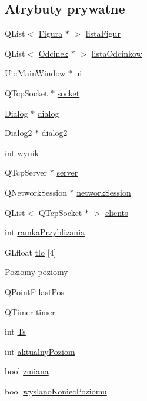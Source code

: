 \subsection*{Atrybuty prywatne}
\begin{DoxyCompactItemize}
\item 
Q\-List$<$ \hyperlink{classFigura}{Figura} $\ast$ $>$ \hyperlink{classMainWindow_a8a91987c12db69417cdb275cf712b9df}{lista\-Figur}
\item 
Q\-List$<$ \hyperlink{classOdcinek}{Odcinek} $\ast$ $>$ \hyperlink{classMainWindow_abaa648f21383f580a833d7ed90f75926}{lista\-Odcinkow}
\item 
\hyperlink{classUi_1_1MainWindow}{Ui\-::\-Main\-Window} $\ast$ \hyperlink{classMainWindow_a43606649aeaf9e561328935fca0cd1bf}{ui}
\item 
Q\-Tcp\-Socket $\ast$ \hyperlink{classMainWindow_af85cfe62c116f8d2f2021e5411b0356e}{socket}
\item 
\hyperlink{classDialog}{Dialog} $\ast$ \hyperlink{classMainWindow_a029f5f35facf7120bbf42e54dbd25a40}{dialog}
\item 
\hyperlink{classDialog2}{Dialog2} $\ast$ \hyperlink{classMainWindow_acca874ff840ec87fe90e0acc72d40e5a}{dialog2}
\item 
int \hyperlink{classMainWindow_a2b0740aaca0b5b566008e55916d4d0e9}{wynik}
\item 
Q\-Tcp\-Server $\ast$ \hyperlink{classMainWindow_a4b1e890b4b33f6ff8c22621d2ce55c2d}{server}
\item 
Q\-Network\-Session $\ast$ \hyperlink{classMainWindow_a638a10aec0de799787205387ee4da83e}{network\-Session}
\item 
Q\-List$<$ Q\-Tcp\-Socket $\ast$ $>$ \hyperlink{classMainWindow_a698f52eb8759a1cde60c5638670b078e}{clients}
\item 
int \hyperlink{classMainWindow_a0909fe6df1d60edacad5591acb011a2f}{ramka\-Przyblizania}
\item 
G\-Lfloat \hyperlink{classMainWindow_a8e9fb49dd7c36fac9e2d83b555e0caa6}{tlo} \mbox{[}4\mbox{]}
\item 
\hyperlink{classPoziomy}{Poziomy} \hyperlink{classMainWindow_a6bc6d2f12427573392ddfbc8d7f454fd}{poziomy}
\item 
Q\-Point\-F \hyperlink{classMainWindow_a479094513b0598030f63a24963e2109e}{last\-Pos}
\item 
Q\-Timer \hyperlink{classMainWindow_a3c80cf51d9dfb16e655a7e25f8016e3b}{timer}
\item 
int \hyperlink{classMainWindow_a0fae41d96da5ca0d54f398025e19ec3a}{Ts}
\item 
int \hyperlink{classMainWindow_aeff57fcdb7d82d6f69b1214ce24d1ecd}{aktualny\-Poziom}
\item 
bool \hyperlink{classMainWindow_a331bf910d34ef19115989bba99c16b7b}{zmiana}
\item 
bool \hyperlink{classMainWindow_a071cbb3e764cd5a0d37033a5eb82b1e0}{wyslano\-Koniec\-Poziomu}
\end{DoxyCompactItemize}


